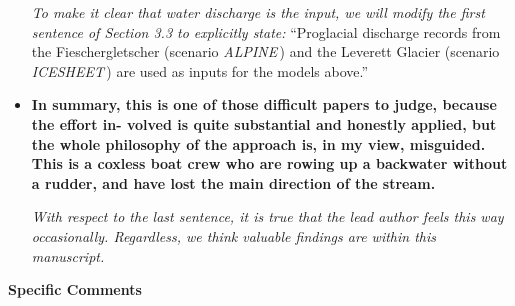 \documentclass[11pt]{article}
\newcommand{\alpine}{\textit{ALPINE}\,}
\newcommand{\icesheet}{\textit{ICESHEET}\,}
\begin{document}
\begin{itemize}
  \textit{To make it clear that water discharge is the input, we will modify the first sentence of Section 3.3 to explicitly state:}
    ``Proglacial discharge records from the Fieschergletscher (scenario \alpine{}) and the Leverett Glacier (scenario \icesheet{}) are used as inputs for the models above.''

\item \textbf{  In summary, this is one of those difficult papers to judge, because the effort in- volved is quite substantial and honestly applied, but the whole philosophy of the approach is, in my view, misguided. This is a coxless boat crew who are rowing up a backwater without a rudder, and have lost the main direction of the stream.}

  \textit{With respect to the last sentence, it is true that the lead author feels this way occasionally. Regardless, we think valuable findings are within this manuscript.}

\end{itemize}

\textbf{Specific Comments}
\end{document}
